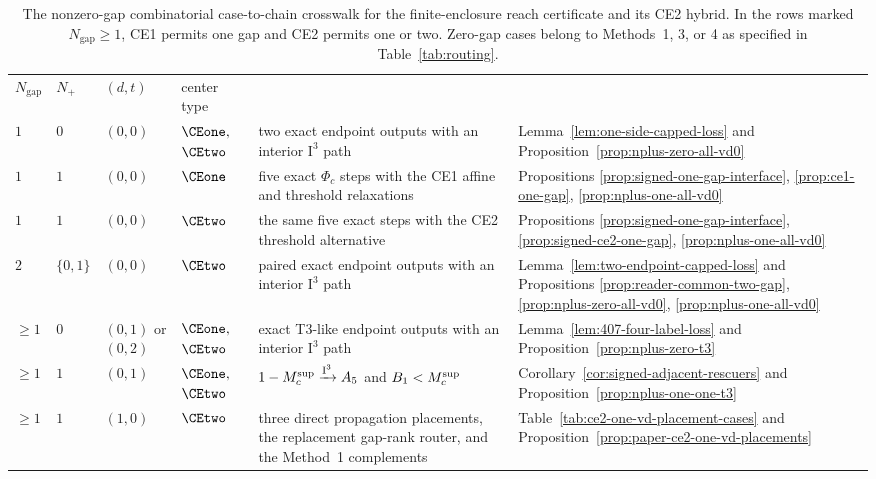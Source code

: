 \begin{table}[H]
\centering
\scriptsize
\setlength{\tabcolsep}{2pt}
\begin{tabular}{@{}
 >{\centering\arraybackslash}p{}
 >{\centering\arraybackslash}p{}
 >{\centering\arraybackslash}p{}
 >{\centering\arraybackslash}p{}
 >{\raggedright\arraybackslash}p{}
 >{\raggedright\arraybackslash}p{}@{}}
\toprule
\multicolumn{4}{c}{combinatorial case}
 &\multicolumn{1}{c}{retained chain}
 &\multicolumn{1}{c}{closing result}\\
\cmidrule(lr){1-4}
$N_{\mathrm{gap}}$&$N_+$&$(d,t)$&center type&&\\
\midrule
$1$&$0$&$(0,0)$&$\CEone,$ $\CEtwo$
 &two exact endpoint outputs with an interior $\mathrm I^3$ path
 &Lemma~\ref{lem:one-side-capped-loss} and
  Proposition~\ref{prop:nplus-zero-all-vd0}\\
\addlinespace[.35em]
$1$&$1$&$(0,0)$&$\CEone$
 &five exact $\Phi_c$ steps with the CE1 affine and threshold relaxations
 &Propositions \ref{prop:signed-one-gap-interface},
  \ref{prop:ce1-one-gap}, \ref{prop:nplus-one-all-vd0}\\
\addlinespace[.35em]
$1$&$1$&$(0,0)$&$\CEtwo$
 &the same five exact steps with the CE2 threshold alternative
 &Propositions \ref{prop:signed-one-gap-interface},
  \ref{prop:signed-ce2-one-gap}, \ref{prop:nplus-one-all-vd0}\\
\addlinespace[.35em]
$2$&$\{0,1\}$&$(0,0)$&$\CEtwo$
 &paired exact endpoint outputs with an interior $\mathrm I^3$ path
 &Lemma~\ref{lem:two-endpoint-capped-loss} and Propositions
  \ref{prop:reader-common-two-gap}, \ref{prop:nplus-zero-all-vd0},
  \ref{prop:nplus-one-all-vd0}\\
\addlinespace[.35em]
$\ge1$&$0$&$(0,1)$ or $(0,2)$&$\CEone,$ $\CEtwo$
 &exact T3-like endpoint outputs with an interior $\mathrm I^3$ path
 &Lemma~\ref{lem:407-four-label-loss} and
  Proposition~\ref{prop:nplus-zero-t3}\\
\addlinespace[.35em]
$\ge1$&$1$&$(0,1)$&$\CEone,$ $\CEtwo$
 &$1-M_c^{\rm sup}\xrightarrow{\mathrm I^3}A_5$ and
  $B_1<M_c^{\rm sup}$
 &Corollary~\ref{cor:signed-adjacent-rescuers} and
  Proposition~\ref{prop:nplus-one-one-t3}\\
\addlinespace[.35em]
$\ge1$&$1$&$(1,0)$&$\CEtwo$
 &three direct propagation placements, the replacement gap-rank router, and
  the Method~1 complements
 &Table~\ref{tab:ce2-one-vd-placement-cases} and
  Proposition~\ref{prop:paper-ce2-one-vd-placements}\\
\bottomrule
\end{tabular}
\caption{The nonzero-gap combinatorial case-to-chain crosswalk for the finite-enclosure reach certificate
and its CE2 hybrid.  In the rows marked $N_{\mathrm{gap}}\ge1$, CE1 permits
one gap and CE2 permits one or two.  Zero-gap cases belong to Methods~1, 3,
or 4 as specified in Table~\ref{tab:routing}.}
\label{tab:strategy2-case-chain}
\end{table}

